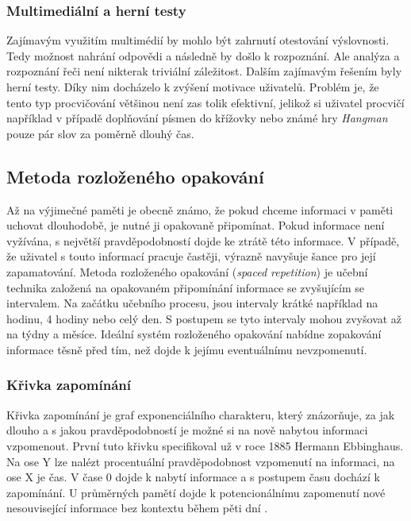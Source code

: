 \documentclass[a4paper,11pt,titlepage,fleqn]{article}
\begin{document}
            \subsubsection{Multimediální a herní testy}
                Zajímavým využitím multimédií by mohlo být zahrnutí otestování výslovnosti. Tedy možnost nahrání odpovědi a následně by došlo k rozpoznání. Ale analýza a rozpoznání řeči není nikterak triviální záležitost. Dalším zajímavým řešením byly herní testy. Díky nim docházelo k zvýšení motivace uživatelů. Problém je, že tento typ procvičování většinou není zas tolik efektivní, jelikož si uživatel procvičí například v případě doplňování písmen do křížovky nebo známé hry \textit{Hangman} pouze pár slov za poměrně dlouhý čas.

        \subsection{Metoda rozloženého opakování}
            \label{spaced-repetition}
            Až na výjimečné paměti je obecně známo, že pokud chceme informaci v paměti uchovat dlouhodobě, je nutné ji opakovaně připomínat. Pokud informace není vyžívána, s největší pravděpodobností dojde ke ztrátě této informace. V případě, že uživatel s touto informací pracuje častěji, výrazně navyšuje šance pro její zapamatování. Metoda rozloženého opakování (\textit{spaced repetition}) je učební technika založená na opakovaném připomínání informace se zvyšujícím se intervalem\cite{bib:spaced-rep}. Na začátku učebního procesu, jsou intervaly krátké například na hodinu, 4 hodiny nebo celý den. S postupem se tyto intervaly mohou zvyšovat až na týdny a měsíce. Ideální systém rozloženého opakování nabídne zopakování informace těsně před tím, než dojde k jejímu eventuálnímu nevzpomenutí.

        \subsubsection{Křivka zapomínání}
            Křivka zapomínání je graf exponenciálního charakteru, který znázorňuje, za jak dlouho a s jakou pravděpodobností je možné si na nově nabytou informaci vzpomenout. První tuto křivku specifikoval už v roce 1885 Hermann Ebbinghaus. Na ose Y lze nalézt procentuální pravděpodobnost vzpomenutí na informaci, na ose X je čas. V čase 0 dojde k nabytí informace a s postupem času dochází k zapomínání. U průměrných pamětí dojde k potencionálnímu zapomenutí nové nesouvisející informace bez kontextu během pěti dní \cite{bib:ebbinghaus}.
\end{document}
